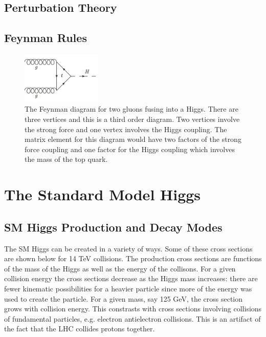 \subsection{Perturbation Theory}
\subsection{Feynman Rules}

\begin{figure}[h!]
  \centering
  \includegraphics[width=1.5in]{images/ggf.png}
  \caption
   {The Feynman diagram for two gluons fusing into a Higgs. There are three vertices and this is a third order diagram. Two vertices involve the strong force and one vertex involves the Higgs coupling. The matrix element for this diagram would have two factors of the strong force coupling and one factor for the Higgs coupling which involves the mass of the top quark.}
  \label{fig:feynggf}
\end{figure}

\section{The Standard Model Higgs}


\subsection{SM Higgs Production and Decay Modes}

The SM Higgs can be created in a variety of ways. Some of these cross sections are shown below for 14 TeV collisions. The production cross sections are functions of the mass of the Higgs as well as the energy of the collisons. For a given collision energy the cross sections decrease as the Higgs mass increases: there are fewer kinematic possibilities for a heavier particle since more of the energy was used to create the particle. For a given mass, say 125 GeV, the cross section grows with collision energy. This constrasts with cross sections involving collisions of fundamental particles, e.g. electron antielectron collisions. This is an artifact of the fact that the LHC collides protons together. 

